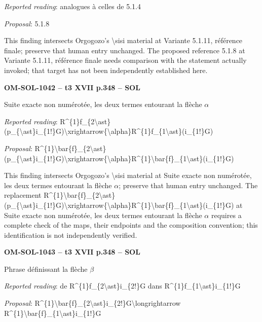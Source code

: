 \emph{Reported reading}: analogues à celles de 5.1.4\par
\emph{Proposal}: 5.1.8\par
This finding intersects Orgogozo's \textbackslash{}sisi material at Variante 5.1.11, référence finale; preserve that human entry unchanged. The proposed reference 5.1.8 at Variante 5.1.11, référence finale needs comparison with the statement actually invoked; that target has not been independently established here.\par
\par\noindent\textbf{OM-SOL-1042 -- t3 XVII p.348 -- SOL}\par
Suite exacte non numérotée, les deux termes entourant la flèche \ensuremath{\alpha}\par
\emph{Reported reading}: R\textasciicircum{}\{1\}f\_\{2\textbackslash{}ast\}(p\_\{\textbackslash{}ast\}i\_\{1!\}G)\textbackslash{}xrightarrow\{\textbackslash{}alpha\}R\textasciicircum{}\{1\}f\_\{1\textbackslash{}ast\}(i\_\{1!\}G)\par
\emph{Proposal}: R\textasciicircum{}\{1\}\textbackslash{}bar\{f\}\_\{2\textbackslash{}ast\}(p\_\{\textbackslash{}ast\}i\_\{1!\}G)\textbackslash{}xrightarrow\{\textbackslash{}alpha\}R\textasciicircum{}\{1\}\textbackslash{}bar\{f\}\_\{1\textbackslash{}ast\}(i\_\{1!\}G)\par
This finding intersects Orgogozo's \textbackslash{}sisi material at Suite exacte non numérotée, les deux termes entourant la flèche \ensuremath{\alpha}; preserve that human entry unchanged. The replacement R\textasciicircum{}\{1\}\textbackslash{}bar\{f\}\_\{2\textbackslash{}ast\}(p\_\{\textbackslash{}ast\}i\_\{1!\}G)\textbackslash{}xrightarrow\{\textbackslash{}alpha\}R\textasciicircum{}\{1\}\textbackslash{}bar\{f\}\_\{1\textbackslash{}ast\}(i\_\{1!\}G) at Suite exacte non numérotée, les deux termes entourant la flèche \ensuremath{\alpha} requires a complete check of the maps, their endpoints and the composition convention; this identification is not independently verified.\par
\par\noindent\textbf{OM-SOL-1043 -- t3 XVII p.348 -- SOL}\par
Phrase définissant la flèche \ensuremath{\beta}\par
\emph{Reported reading}: de R\textasciicircum{}\{1\}f\_\{2\textbackslash{}ast\}i\_\{2!\}G dans R\textasciicircum{}\{1\}f\_\{1\textbackslash{}ast\}i\_\{1!\}G\par
\emph{Proposal}: R\textasciicircum{}\{1\}\textbackslash{}bar\{f\}\_\{2\textbackslash{}ast\}i\_\{2!\}G\textbackslash{}longrightarrow R\textasciicircum{}\{1\}\textbackslash{}bar\{f\}\_\{1\textbackslash{}ast\}i\_\{1!\}G\par
